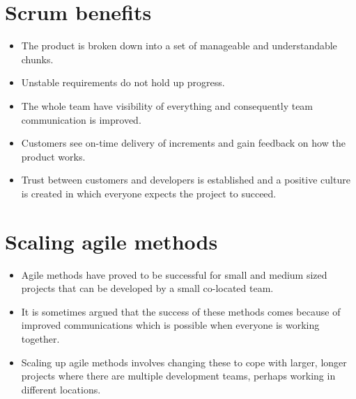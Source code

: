 \section{ Scrum benefits}
\begin{itemize}

\item The product is broken down into a set of manageable and understandable chunks.

\item Unstable requirements do not hold up progress.

\item The whole team have visibility of everything and consequently team communication is improved.

\item Customers see on-time delivery of increments and gain feedback on how the product works.

\item Trust between customers and developers is established and a positive culture is created in which everyone expects the project to succeed.

\end{itemize}
\section{ Scaling agile methods}
\begin{itemize}

\item Agile methods have proved to be successful for small and medium sized projects that can be developed by a small co-located team.

\item It is sometimes argued that the success of these methods comes because of improved communications which is possible when everyone is working together.

\item Scaling up agile methods involves changing these to cope with larger, longer projects where there are multiple development teams, perhaps working in different locations.

\end{itemize}
